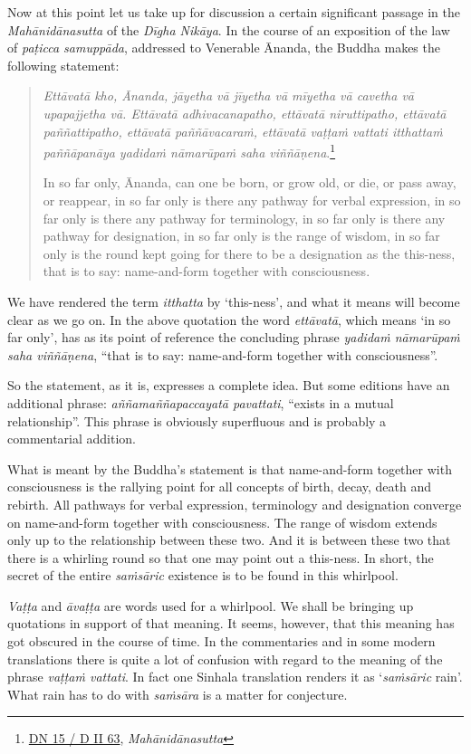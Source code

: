 Now at this point let us take up for discussion a certain significant passage in the \emph{Mahānidānasutta} of the \emph{Dīgha Nikāya}. In the course of an exposition of the law of \emph{paṭicca samuppāda}, addressed to Venerable Ānanda, the Buddha makes the following statement:

\begin{quote}
\emph{Ettāvatā kho, Ānanda, jāyetha vā jīyetha vā mīyetha vā cavetha vā upapajjetha vā. Ettāvatā adhivacanapatho, ettāvatā niruttipatho, ettāvatā paññattipatho, ettāvatā paññāvacaraṁ, ettāvatā vaṭṭaṁ vattati itthattaṁ paññāpanāya yadidaṁ nāmarūpaṁ saha viññāṇena}.\footnote{\href{https://suttacentral.net/dn15/pli/ms}{DN 15 / D II 63}, \emph{Mahānidānasutta}}

In so far only, Ānanda, can one be born, or grow old, or die, or pass away, or reappear, in so far only is there any pathway for verbal expression, in so far only is there any pathway for terminology, in so far only is there any pathway for designation, in so far only is the range of wisdom, in so far only is the round kept going for there to be a designation as the this-ness, that is to say: name-and-form together with consciousness.
\end{quote}

We have rendered the term \emph{itthatta} by `this-ness', and what it means will become clear as we go on. In the above quotation the word \emph{ettāvatā}, which means `in so far only', has as its point of reference the concluding phrase \emph{yadidaṁ nāmarūpaṁ saha viññāṇena}, ``that is to say: name-and-form together with consciousness''.

So the statement, as it is, expresses a complete idea. But some editions have an additional phrase: \emph{aññamaññapaccayatā pavattati}, ``exists in a mutual relationship''. This phrase is obviously superfluous and is probably a commentarial addition.

What is meant by the Buddha's statement is that name-and-form together with consciousness is the rallying point for all concepts of birth, decay, death and rebirth. All pathways for verbal expression, terminology and designation converge on name-and-form together with consciousness. The range of wisdom extends only up to the relationship between these two. And it is between these two that there is a whirling round so that one may point out a this-ness. In short, the secret of the entire \emph{saṁsāric} existence is to be found in this whirlpool.

\emph{Vaṭṭa} and \emph{āvaṭṭa} are words used for a whirlpool. We shall be bringing up quotations in support of that meaning. It seems, however, that this meaning has got obscured in the course of time. In the commentaries and in some modern translations there is quite a lot of confusion with regard to the meaning of the phrase \emph{vaṭṭaṁ vattati}. In fact one Sinhala translation renders it as `\emph{saṁsāric} rain'. What rain has to do with \emph{saṁsāra} is a matter for conjecture.

